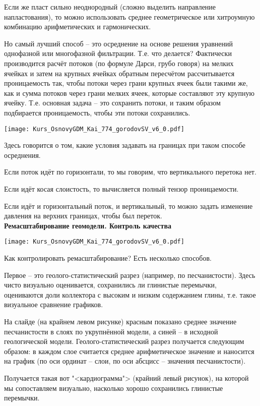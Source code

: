Если же пласт сильно неоднородный (сложно выделить направление напластования), то можно использовать среднее геометрическое или хитроумную комбинацию арифметических и гармонических.

Но самый лучший способ -- это осреднение на основе решения уравнений однофазной или многофазной фильтрации.
Т.е. что делается?
Фактически производится расчёт потоков (по формуле Дарси, грубо говоря) на мелких ячейках и затем на крупных ячейках обратным пересчётом рассчитывается проницаемость так, чтобы потоки через грани крупных ячеек были такими же, как и сумма потоков через грани мелких ячеек, которые составляют эту крупную ячейку. Т.е. основная задача -- это сохранить потоки, и таким образом подбирается проницаемость, чтобы эти потоки сохранились.

\texttt{[image: Kurs\_OsnovyGDM\_Kai\_774\_gorodovSV\_v6\_0.pdf]}

Здесь говорится о том, какие условия задавать на границах при таком способе осреднения.

Если поток идёт по горизонтали, то мы говорим, что вертикального перетока нет.

Если идёт косая слоистость, то вычисляется полный тензор проницаемости.

Если идёт и горизонтальный поток, и вертикальный, то можно задать изменение давления на верхних границах, чтобы был переток.
\\

\textbf{Ремасштабирование геомодели. Контроль качества}

\texttt{[image: Kurs\_OsnovyGDM\_Kai\_774\_gorodovSV\_v6\_0.pdf]}

Как контролировать ремасштабирование?
Есть несколько способов.

Первое -- это геолого-статистический разрез (например, по песчанистости).
Здесь чисто визуально оценивается, сохранились ли глинистые перемычки, оцениваются доли коллектора с высоким и низким содержанием глины, т.е. такое визуальное сравнение графиков.

На слайде (на крайнем левом рисунке) красным показано среднее значение песчанистости в слоях по укрупнённой модели, а синей -- в исходной геологической модели.
Геолого-статистический разрез получается следующим образом: в каждом слое считается среднее арифметическое значение и наносится на график (по оси ординат -- слои, по оси абсцисс -- значения песчанистости).

Получается такая вот "<кардиограмма"> (крайний левый рисунок), на которой мы сопоставляем визуально, насколько хорошо сохранились глинистые перемычки.

